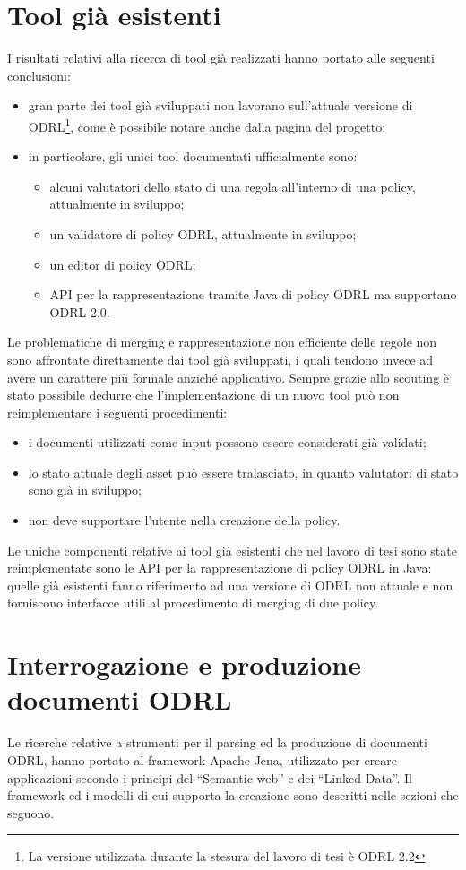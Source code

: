 \documentclass[12pt,a4paper,twoside]{book}
\begin{document}
\section{Tool già esistenti}
I risultati relativi alla ricerca di tool già realizzati hanno portato alle seguenti conclusioni:
\begin{itemize}
	\item gran parte dei tool già sviluppati non lavorano sull'attuale versione di ODRL\footnote{La versione utilizzata durante la stesura del lavoro di tesi è ODRL 2.2 }, come è possibile notare anche dalla pagina del progetto\cite{ODRLPage};
	\item in particolare, gli unici tool documentati ufficialmente sono:
	\begin{itemize}
		\item alcuni valutatori dello stato di una regola all'interno di una policy\cite{evalStatus}, attualmente in sviluppo;
		\item un validatore di policy ODRL\cite{validator}, attualmente in sviluppo;
		\item un editor di policy ODRL\cite{editor};
		\item API per la rappresentazione tramite Java di policy ODRL\cite{api} ma supportano ODRL 2.0.
	\end{itemize}
\end{itemize}
Le problematiche di merging e rappresentazione non efficiente delle regole non sono affrontate direttamente dai tool già sviluppati, i quali tendono invece ad avere un carattere più formale anziché applicativo. Sempre grazie allo scouting è stato possibile dedurre che l'implementazione di un nuovo tool può non reimplementare i seguenti procedimenti:
\begin{itemize}
	\item i documenti utilizzati come input possono essere considerati già validati;
	\item lo stato attuale degli asset può essere tralasciato, in quanto valutatori di stato sono già in sviluppo;
	\item non deve supportare l'utente nella creazione della policy.
\end{itemize}
Le uniche componenti relative ai tool già esistenti che nel lavoro di tesi sono state reimplementate sono le API per la rappresentazione di policy ODRL in Java: quelle già esistenti fanno riferimento ad una versione di ODRL non attuale e non forniscono interfacce utili al procedimento di merging di due policy. 
\section{Interrogazione e produzione documenti ODRL}
Le ricerche relative a strumenti per il parsing ed la produzione di documenti ODRL, hanno portato al framework Apache Jena\cite{Jena}, utilizzato per creare applicazioni secondo i principi del ``Semantic web''\cite{SemanticWeb} e dei ``Linked Data''. Il framework ed i modelli di cui supporta la creazione sono descritti nelle sezioni che seguono.
\end{document}
